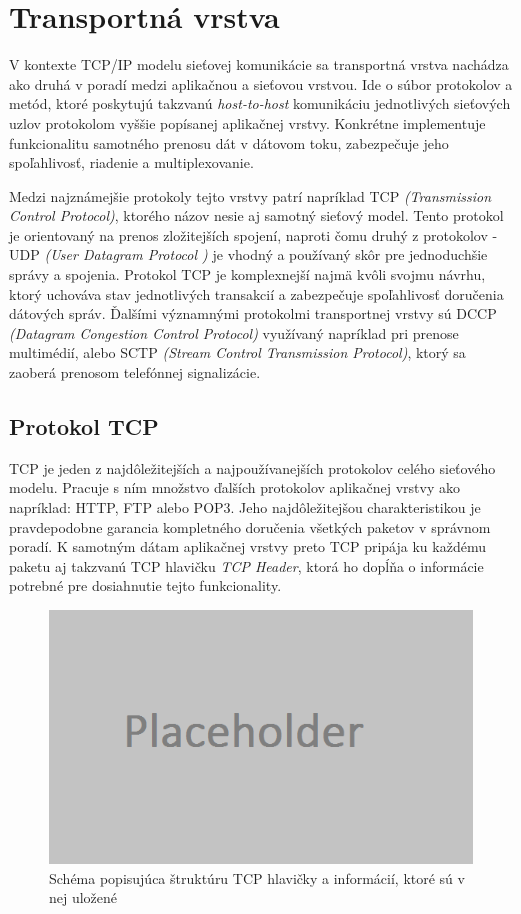 \documentclass[
  printed, %
  table,   %
  lof,     %
  lot,     %
]{fithesis3}
\begin{document}
\section{Transportná vrstva}
V kontexte TCP/IP modelu sieťovej komunikácie sa transportná vrstva nachádza
ako druhá v poradí medzi aplikačnou a sieťovou vrstvou. Ide o súbor protokolov
a metód, ktoré poskytujú takzvanú \textit{host-to-host} komunikáciu
jednotlivých sieťových uzlov protokolom vyššie popísanej aplikačnej vrstvy.
Konkrétne implementuje funkcionalitu samotného prenosu dát v dátovom toku,
zabezpečuje jeho spoľahlivosť, riadenie a multiplexovanie. 

Medzi najznámejšie protokoly tejto vrstvy patrí napríklad TCP
\textit{(Transmission Control Protocol)}, ktorého názov nesie aj samotný
sieťový model. Tento protokol je orientovaný na prenos zložitejších spojení,
naproti čomu druhý z protokolov - UDP \textit{(User Datagram Protocol )} je
vhodný a používaný skôr pre jednoduchšie správy a spojenia. Protokol TCP je
komplexnejší najmä kvôli svojmu návrhu, ktorý uchováva stav jednotlivých
transakcií a zabezpečuje spoľahlivosť doručenia dátových správ. Ďalšími
významnými protokolmi transportnej vrstvy sú DCCP
\textit{(Datagram Congestion Control Protocol)} využívaný napríklad pri prenose
multimédií, alebo SCTP \textit{(Stream Control Transmission Protocol)}, ktorý
sa zaoberá prenosom telefónnej signalizácie.

\subsection{Protokol TCP}
TCP je jeden z najdôležitejších a najpoužívanejších protokolov celého sieťového
modelu. Pracuje s ním množstvo ďalších protokolov aplikačnej vrstvy ako
napríklad: HTTP, FTP alebo POP3. Jeho najdôležitejšou charakteristikou je
pravdepodobne garancia kompletného doručenia všetkých paketov v správnom
poradí. K samotným dátam aplikačnej vrstvy preto TCP pripája ku každému paketu
aj takzvanú TCP hlavičku \textit{TCP Header}, ktorá ho dopĺňa o informácie
potrebné pre dosiahnutie tejto funkcionality.

\begin{figure}[h]
  \centering
    \includegraphics[width=.80\textwidth]{images/net-tcp-head.png}
  \caption{Schéma popisujúca štruktúru TCP hlavičky a informácií, ktoré sú v
  nej uložené}
  \label{fig:net-tcp-head}
\end{figure}
\end{document}
